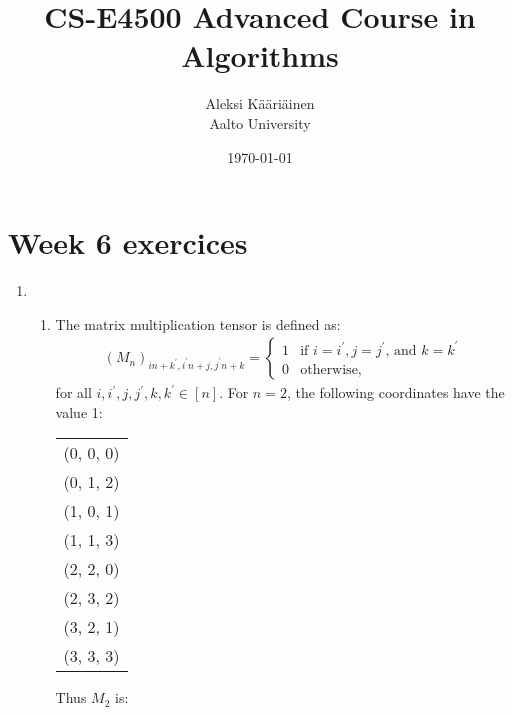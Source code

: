 \documentclass[11pt,a4paper]{article}
\title{CS-E4500 Advanced Course in Algorithms}
\author{Aleksi Kääriäinen  \\
	Aalto University  \\
	}
\begin{document}
\date{\today}

\maketitle

\newpage

\section*{Week 6 exercices}

\begin{enumerate}
    \item \begin{enumerate}
              \item The matrix multiplication tensor is defined as:
                    \begin{align*}
                        (M_n)_{in + k^\prime, i^\prime n + j, j^\prime n + k} = \begin{cases}
                                                                                    1 & \text{if } i = i^\prime, j = j^\prime \text{, and }k = k^\prime \\
                                                                                    0 & \text{otherwise},
                                                                                \end{cases}
                    \end{align*} for all $i, i^\prime, j, j^\prime, k, k^\prime \in [n]$.
                    For $n = 2$, the following coordinates have the value 1:
                    \begin{center}
                        \begin{tabular}{c}
                            (0, 0, 0) \\
                            (0, 1, 2) \\
                            (1, 0, 1) \\
                            (1, 1, 3) \\
                            (2, 2, 0) \\
                            (2, 3, 2) \\
                            (3, 2, 1) \\
                            (3, 3, 3)
                        \end{tabular}
                    \end{center}
                    Thus $M_2$ is:

\end{enumerate}
\end{enumerate}
\end{document}
